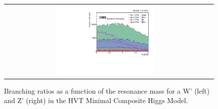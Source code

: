 \begin{figure}[t]
\begin{tabular}{cc}
    \includegraphics[width=0.5\textwidth]{Figures/MC_N1/deltaEta.pdf} \\
  \end{tabular}
  \caption{Branching ratios as a function of the resonance mass for a W' (left) and Z' (right) in the HVT Minimal Composite Higgs Model.}
  \label{fig:hvt_brs}
\end{figure}

